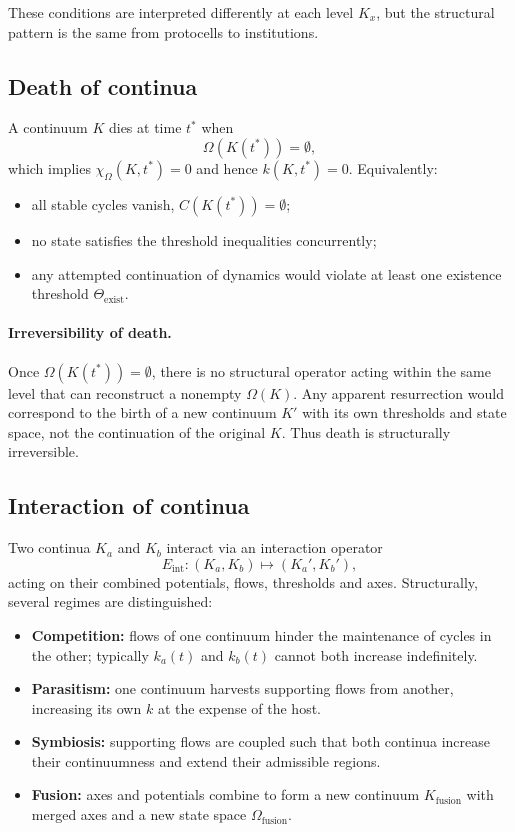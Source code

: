These conditions are interpreted differently at each level \(K_x\), but the structural pattern is the same from protocells to institutions.

\subsection{Death of continua}

A continuum \(K\) dies at time \(t^\ast\) when
\[
    \Omega(K(t^\ast)) = \emptyset,
\]
which implies \(\chi_{\Omega}(K,t^\ast)=0\) and hence \(k(K,t^\ast)=0\).
Equivalently:
\begin{itemize}
    \item all stable cycles vanish, \(C(K(t^\ast)) = \emptyset\);
    \item no state satisfies the threshold inequalities concurrently;
    \item any attempted continuation of dynamics would violate at least one existence threshold \(\Theta_{\mathrm{exist}}\).
\end{itemize}

\paragraph{Irreversibility of death.}
Once \(\Omega(K(t^\ast)) = \emptyset\), there is no structural operator acting within the same level that can reconstruct a nonempty \(\Omega(K)\).
Any apparent resurrection would correspond to the birth of a new continuum \(K'\) with its own thresholds and state space, not the continuation of the original \(K\).
Thus death is structurally irreversible.

\subsection{Interaction of continua}

Two continua \(K_a\) and \(K_b\) interact via an interaction operator
\[
    E_{\mathrm{int}} : (K_a,K_b) \mapsto (K_a',K_b'),
\]
acting on their combined potentials, flows, thresholds and axes.
Structurally, several regimes are distinguished:

\begin{itemize}
    \item \textbf{Competition:} flows of one continuum hinder the maintenance of cycles in the other; typically \(k_a(t)\) and \(k_b(t)\) cannot both increase indefinitely.
    \item \textbf{Parasitism:} one continuum harvests supporting flows from another, increasing its own \(k\) at the expense of the host.
    \item \textbf{Symbiosis:} supporting flows are coupled such that both continua increase their continuumness and extend their admissible regions.
    \item \textbf{Fusion:} axes and potentials combine to form a new continuum \(K_{\mathrm{fusion}}\) with merged axes and a new state space \(\Omega_{\mathrm{fusion}}\).
\end{itemize}


